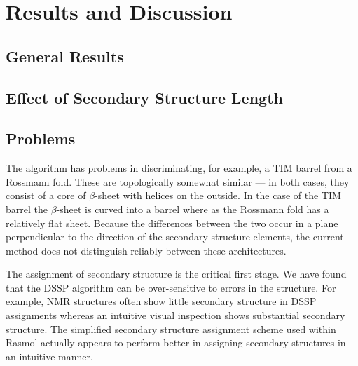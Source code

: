 \documentclass{article}
\begin{document}
\section{Results and Discussion}




\subsection{General Results}


\subsection{Effect of Secondary Structure Length}


\subsection{Problems}
The algorithm has problems in discriminating, for example, a TIM
barrel from a Rossmann fold. These are topologically somewhat similar
--- in both cases, they consist of a core of $\beta$-sheet with
helices on the outside. In the case of the TIM barrel the
$\beta$-sheet is curved into a barrel where as the Rossmann fold has a
relatively flat sheet. Because the differences between the two occur
in a plane perpendicular to the direction of the secondary structure
elements, the current method does not distinguish reliably between these
architectures. 

The assignment of secondary structure is the critical first stage. We
have found that the DSSP algorithm can be over-sensitive to errors in
the structure. For example, NMR structures often show little secondary
structure in DSSP assignments whereas an intuitive visual inspection
shows substantial secondary structure. The simplified secondary
structure assignment scheme used within Rasmol actually appears to
perform better in assigning secondary structures in an intuitive
manner. 
\end{document}

